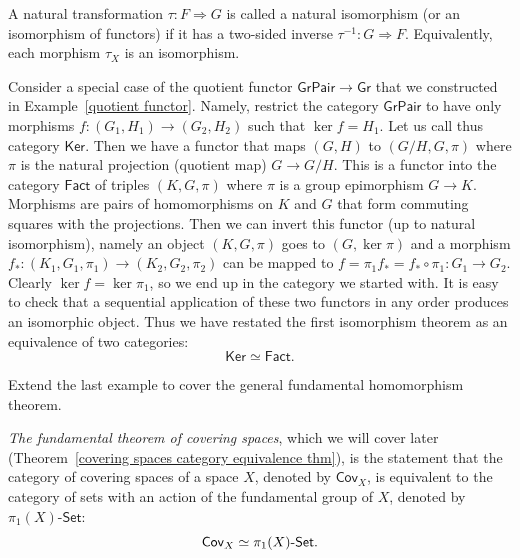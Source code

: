 %
\begin{defn}
    A natural transformation $\tau:F\Longrightarrow G$ is called a natural isomorphism (or an isomorphism of functors) if it has a two-sided inverse $\tau^{-1}:G\Longrightarrow F$. Equivalently, each morphism $\tau_X$ is an isomorphism.
\end{defn}
%
\begin{example}
Consider a special case of the quotient functor $\mathsf{GrPair}\to\mathsf{Gr}$
that we constructed in Example~\ref{quotient functor}. Namely, restrict
the category $\mathsf{GrPair}$ to have only morphisms $f:\left(G_{1},H_{1}\right)\to\left(G_{2},H_{2}\right)$
such that $\ker f=H_{1}$. Let us call thus category $\mathsf{Ker}$.
Then we have a functor that maps $\left(G,H\right)$ to $\left(G/H,G,\pi\right)$
where $\pi$ is the natural projection (quotient map) $G\to G/H$.
This is a functor into the category $\mathsf{Fact}$ of triples $\left(K,G,\pi\right)$
where $\pi$ is a group epimorphism $G\to K$. Morphisms are pairs
of homomorphisms on $K$ and $G$ that form commuting squares with
the projections. Then we can invert this functor (up to natural isomorphism),
namely an object $\left(K,G,\pi\right)$ goes to $\left(G,\ker\pi\right)$
and a morphism $f_{\ast}:\left(K_{1},G_{1},\pi_{1}\right)\to\left(K_{2},G_{2},\pi_{2}\right)$
can be mapped to $f=\pi_{1}f_{\ast}=f_{\ast}\circ\pi_{1}:G_{1}\to G_{2}$.
Clearly $\ker f=\ker\pi_{1}$, so we end up in the category we started
with. It is easy to check that a sequential application of these two
functors in any order produces an isomorphic object. Thus we have
restated the first isomorphism theorem as an equivalence of two categories:
\[
\mathsf{Ker}\simeq\mathsf{Fact}.
\]
\end{example}
\begin{xca}
Extend the last example to cover the general fundamental homomorphism
theorem.
\end{xca}
\begin{example}\label{covering category thm}
\emph{The fundamental theorem of covering spaces},
which we will cover later (Theorem~\ref{covering spaces category equivalence thm}), is the statement that the category of covering
spaces of a space $X$, denoted by $\mathsf{Cov}_{X}$, is equivalent
to the category of sets with an action of the fundamental group of
$X$, denoted by $\pi_{1}\left(X\right)\text{-}\mathsf{Set}$:
\[
\mathsf{Cov}_{X}\simeq \pi_{1}(X){\text -}\mathsf{Set}.
\]
\end{example}
%
